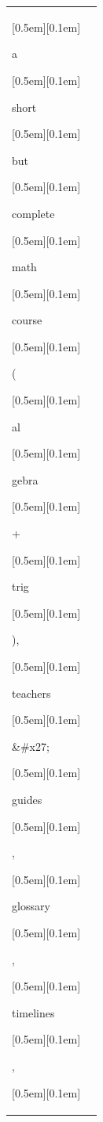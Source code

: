 \begin{table}[ht]
\begin{tabular}{@{}l p{13cm}@{}}
{\setlength{\fboxsep}{1pt}\raisebox{0pt}[0.5em][0.1em]{\colorbox{SkyBlue!55}{\strut{ a}}}}{\setlength{\fboxsep}{1pt}\raisebox{0pt}[0.5em][0.1em]{\colorbox{Salmon!60}{\strut{ short}}}}{\setlength{\fboxsep}{1pt}\raisebox{0pt}[0.5em][0.1em]{\colorbox{SkyBlue!55}{\strut{ but}}}}{\setlength{\fboxsep}{1pt}\raisebox{0pt}[0.5em][0.1em]{\colorbox{Salmon!60}{\strut{ complete}}}}{\setlength{\fboxsep}{1pt}\raisebox{0pt}[0.5em][0.1em]{\colorbox{Salmon!60}{\strut{ math}}}}{\setlength{\fboxsep}{1pt}\raisebox{0pt}[0.5em][0.1em]{\colorbox{DarkOrchid!25}{\strut{ course}}}}{\setlength{\fboxsep}{1pt}\raisebox{0pt}[0.5em][0.1em]{\colorbox{SkyBlue!55}{\strut{ (}}}}{\setlength{\fboxsep}{1pt}\raisebox{0pt}[0.5em][0.1em]{\colorbox{DarkOrchid!25}{\strut{al}}}}{\setlength{\fboxsep}{1pt}\raisebox{0pt}[0.5em][0.1em]{\colorbox{Salmon!60}{\strut{gebra}}}}{\setlength{\fboxsep}{1pt}\raisebox{0pt}[0.5em][0.1em]{\colorbox{SkyBlue!55}{\strut{ +}}}}{\setlength{\fboxsep}{1pt}\raisebox{0pt}[0.5em][0.1em]{\colorbox{DarkOrchid!25}{\strut{ trig}}}}{\setlength{\fboxsep}{1pt}\raisebox{0pt}[0.5em][0.1em]{\colorbox{SkyBlue!55}{\strut{),}}}}{\setlength{\fboxsep}{1pt}\raisebox{0pt}[0.5em][0.1em]{\colorbox{Salmon!60}{\strut{ teachers}}}}{\setlength{\fboxsep}{1pt}\raisebox{0pt}[0.5em][0.1em]{\colorbox{Salmon!60}{\strut{\&\#x27;}}}}{\setlength{\fboxsep}{1pt}\raisebox{0pt}[0.5em][0.1em]{\colorbox{DarkOrchid!25}{\strut{ guides}}}}{\setlength{\fboxsep}{1pt}\raisebox{0pt}[0.5em][0.1em]{\colorbox{SkyBlue!55}{\strut{,}}}}{\setlength{\fboxsep}{1pt}\raisebox{0pt}[0.5em][0.1em]{\colorbox{DarkOrchid!25}{\strut{ glossary}}}}{\setlength{\fboxsep}{1pt}\raisebox{0pt}[0.5em][0.1em]{\colorbox{SkyBlue!55}{\strut{,}}}}{\setlength{\fboxsep}{1pt}\raisebox{0pt}[0.5em][0.1em]{\colorbox{DarkOrchid!25}{\strut{ timelines}}}}{\setlength{\fboxsep}{1pt}\raisebox{0pt}[0.5em][0.1em]{\colorbox{SkyBlue!55}{\strut{,}}}}{\setlength{\fboxsep}{1pt}\raisebox{0pt}[0.5em][0.1em]{\colorbox{DarkOrchid!25}{\strut{ }}}}


\end{tabular}
\end{table}
